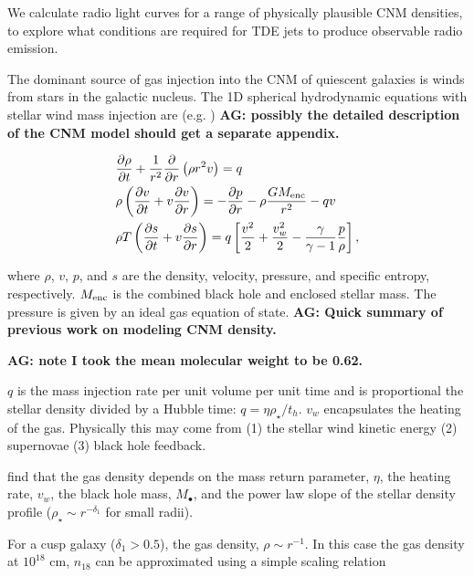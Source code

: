 \documentclass[usenatbib,fleqn]{mnras}
\newcommand{\Mbh}[1][]{M_{\bullet#1}}
\newcommand{\Menc}{M_{\rm enc}}
\renewcommand{\th}{t_h}
\begin{document}
We calculate radio light curves for a range of physically plausible
CNM densities, to explore what conditions are required for TDE jets to
produce observable radio emission. 

The dominant source of gas injection into the CNM of quiescent
galaxies is winds from stars in the galactic nucleus. The 1D spherical
hydrodynamic equations with stellar wind mass injection are
(e.g. \citealt{Holzer+1970}) {\bf AG: possibly the detailed
  description of the CNM model should get a separate appendix.}


\begin{align}
  &\frac{\partial \rho}{\partial t}+\frac{1}{r^2}\frac{\partial}{\partial r}\left(\rho r^2 v\right)=q \label{eq:drhodt}\\
  &\rho \left(\frac{\partial v}{\partial t} + v\frac{\partial
      v}{\partial r}\right) =-\frac{\partial p}{\partial r}- \rho\frac{GM_{\rm enc}}{r^{2}} -q v \label{eq:dvdt}\\
  &\rho T\left(\frac{\partial s}{\partial t} + v\frac{\partial
      s}{\partial
      r}\right)=q\left[\frac{v^2}{2}+\frac{v_w^2}{2}-\frac{\gamma}{\gamma-1}
    \frac{p}{\rho} \right] ,
\label{eq:dsdt}
\end{align}

where $\rho$, $v$, $p$, and $s$ are the density, velocity, pressure, and
specific entropy, respectively.  $\Menc$ is the combined black hole
and enclosed stellar mass. The pressure is given by an ideal gas
equation of state.  {\bf AG: Quick summary of previous work on
  modeling CNM density.}

 {\bf AG: note I took the mean molecular weight to be
  0.62.}

$q$ is the mass injection rate per unit volume per unit time and is
proportional the stellar density divided by a Hubble time: $q=\eta
\rho_\star/\th$. $v_w$ encapsulates the heating of the gas. Physically
this may come from (1) the stellar wind kinetic energy (2) supernovae
(3) black hole feedback.

\citet{Generozov+2015} find that the gas density depends on the
mass return parameter, $\eta$, the heating rate, $v_w$, the black hole
mass, $\Mbh$, and the power law slope of the stellar density profile
($\rho_\star\sim r^{-\delta_1}$ for small radii).

For a cusp galaxy ($\delta_1> 0.5$), the gas density, $\rho\sim
r^{-1}$. In this case the gas density at $10^{18}$ cm, $n_{18}$ can be
approximated using a simple scaling relation 
\end{document}
